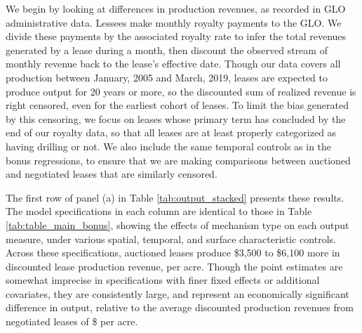 \documentclass[12pt]{article}
\newcommand{\inputy}[1]{\unskip}
\begin{document}
We begin by looking at differences in production revenues, as recorded in GLO administrative data. Lessees make monthly royalty payments to the GLO. We divide these payments by the associated royalty rate to infer the total revenues generated by a lease during a month, then discount the observed stream of monthly revenue back to the lease's effective date.  Though our data covers all production between January, 2005 and March, 2019, leases are expected to produce output for 20 years or more, so the discounted sum of realized revenue is right censored, even for the earliest cohort of leases. To limit the bias generated by this censoring, we focus on leases whose primary term has concluded by the end of our royalty data, so that all leases are at least properly categorized as having drilling or not. We also include the same temporal controls as in the bonus regressions, to ensure that we are making comparisons between auctioned and negotiated leases that are similarly censored.  

The first row of panel (a) in Table \ref{tab:output_stacked} presents these results. The model specifications in each column are identical to those in Table \ref{tab:table_main_bonus}, showing the effects of mechanism type on each output measure, under various spatial, temporal, and surface characteristic controls.  Across these specifications, auctioned leases produce \$3,500 to \$6,100 more in discounted lease production revenue, per acre. Though the point estimates are somewhat imprecise in specifications with finer fixed effects or additional covariates, they are consistently large, and represent an economically significant difference in output, relative to the average discounted production revenues from negotiated leases of \$\inputy{../output/estimates/negotiation_avg_revenue.tex} per acre. 
\end{document}
